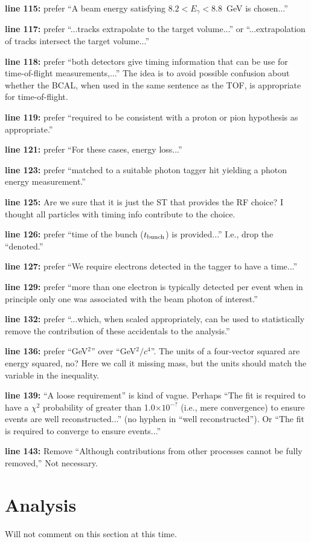 \documentclass{article}
\newcommand{\itm}[1]{\item{\bf line #1:}}
\begin{document}
\begin{description}
\itm{115} prefer ``A beam energy satisfying $8.2 < E_\gamma < 8.8$~GeV is chosen...''
\itm{117} prefer ``...tracks extrapolate to the target volume...'' or ``...extrapolation of tracks intersect the target volume...''
\itm{118} prefer ``both detectors give timing information that can be use for time-of-flight measurements,...'' The idea is to avoid possible confusion about whether the BCAL, when used in the same sentence as the TOF, is appropriate for time-of-flight.
\itm{119} prefer ``required to be consistent with a proton or pion hypothesis as appropriate.''
\itm{121} prefer ``For these cases, energy loss...''
\itm{123} prefer ``matched to a suitable photon tagger hit yielding a photon energy measurement.''
\itm{125} Are we sure that it is just the ST that provides the RF choice? I thought all particles with timing info contribute to the choice.
\itm{126} prefer ``time of the bunch ($t_{\rm bunch}$) is provided...'' I.e., drop the ``denoted.''
\itm{127} prefer ``We require electrons detected in the tagger to have a time...''
\itm{129} prefer ``more than one electron is typically detected per event when in principle only one was associated with the beam photon of interest.''
\itm{132} prefer ``...which, when scaled appropriately, can be used to statistically remove the contribution of these accidentals to the analysis.''
\itm{136} prefer ``GeV$^2$'' over ``GeV$^2/c^4$''. The units of a four-vector squared are energy squared, no? Here we call it missing mass, but the units should match the variable in the inequality.
\itm{139} ``A loose requirement'' is kind of vague. Perhaps ``The fit is required to have a $\chi^2$ probability of greater than 1.0$\times 10^{-?}$ (i.e., mere convergence) to ensure events are well reconstructed...'' (no hyphen in ``well reconstructed''). Or ``The fit is required to converge to ensure events...''
\itm{143} Remove ``Although contributions from other processes cannot be fully removed,'' Not necessary.
\end{description}

\section{Analysis}

Will not comment on this section at this time.
\end{document}
